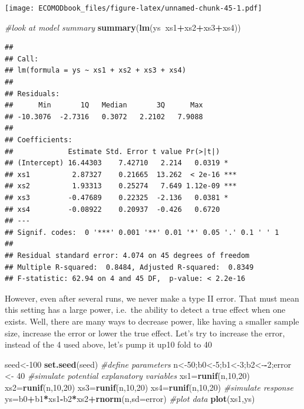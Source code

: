 \documentclass[
]{book}
\newenvironment{Shaded}{\begin{snugshade}}{\end{snugshade}}
\newcommand{\CommentTok}[1]{\textcolor[rgb]{0.56,0.35,0.01}{\textit{#1}}}
\newcommand{\DataTypeTok}[1]{\textcolor[rgb]{0.13,0.29,0.53}{#1}}
\newcommand{\DecValTok}[1]{\textcolor[rgb]{0.00,0.00,0.81}{#1}}
\newcommand{\KeywordTok}[1]{\textcolor[rgb]{0.13,0.29,0.53}{\textbf{#1}}}
\newcommand{\NormalTok}[1]{#1}
\newcommand{\OperatorTok}[1]{\textcolor[rgb]{0.81,0.36,0.00}{\textbf{#1}}}
\newcommand{\StringTok}[1]{\textcolor[rgb]{0.31,0.60,0.02}{#1}}
\begin{document}
\texttt{[image: ECOMODbook\_files/figure-latex/unnamed-chunk-45-1.pdf]}

\begin{Shaded}
\begin{Highlighting}[]
\CommentTok{#look at model summary}
\KeywordTok{summary}\NormalTok{(}\KeywordTok{lm}\NormalTok{(ys}\OperatorTok{~}\NormalTok{xs1}\OperatorTok{+}\NormalTok{xs2}\OperatorTok{+}\NormalTok{xs3}\OperatorTok{+}\NormalTok{xs4))}
\end{Highlighting}
\end{Shaded}

\begin{verbatim}
## 
## Call:
## lm(formula = ys ~ xs1 + xs2 + xs3 + xs4)
## 
## Residuals:
##      Min       1Q   Median       3Q      Max 
## -10.3076  -2.7316   0.3072   2.2102   7.9088 
## 
## Coefficients:
##             Estimate Std. Error t value Pr(>|t|)    
## (Intercept) 16.44303    7.42710   2.214   0.0319 *  
## xs1          2.87327    0.21665  13.262  < 2e-16 ***
## xs2          1.93313    0.25274   7.649 1.12e-09 ***
## xs3         -0.47689    0.22325  -2.136   0.0381 *  
## xs4         -0.08922    0.20937  -0.426   0.6720    
## ---
## Signif. codes:  0 '***' 0.001 '**' 0.01 '*' 0.05 '.' 0.1 ' ' 1
## 
## Residual standard error: 4.074 on 45 degrees of freedom
## Multiple R-squared:  0.8484,	Adjusted R-squared:  0.8349 
## F-statistic: 62.94 on 4 and 45 DF,  p-value: < 2.2e-16
\end{verbatim}

However, even after several runs, we never make a type II error. That must mean this setting has a large power, i.e.~the ability to detect a true effect when one exists. Well, there are many ways to decrease power, like having a smaller sample size, increase the error or lower the true effect. Let's try to increase the error, instead of the 4 used above, let's pump it up10 fold to 40

\begin{Shaded}
\begin{Highlighting}[]
\NormalTok{seed<-}\DecValTok{100}
\KeywordTok{set.seed}\NormalTok{(seed)}
\CommentTok{#define parameters}
\NormalTok{n<-}\DecValTok{50}\NormalTok{;b0<-}\DecValTok{5}\NormalTok{;b1<-}\DecValTok{3}\NormalTok{;b2<-}\OperatorTok{-}\DecValTok{2}\NormalTok{;error <-}\StringTok{ }\DecValTok{40}
\CommentTok{#simulate potential explanatory variables}
\NormalTok{xs1=}\KeywordTok{runif}\NormalTok{(n,}\DecValTok{10}\NormalTok{,}\DecValTok{20}\NormalTok{)}
\NormalTok{xs2=}\KeywordTok{runif}\NormalTok{(n,}\DecValTok{10}\NormalTok{,}\DecValTok{20}\NormalTok{)}
\NormalTok{xs3=}\KeywordTok{runif}\NormalTok{(n,}\DecValTok{10}\NormalTok{,}\DecValTok{20}\NormalTok{)}
\NormalTok{xs4=}\KeywordTok{runif}\NormalTok{(n,}\DecValTok{10}\NormalTok{,}\DecValTok{20}\NormalTok{)}
\CommentTok{#simulate response}
\NormalTok{ys=b0}\OperatorTok{+}\NormalTok{b1}\OperatorTok{*}\NormalTok{xs1}\OperatorTok{-}\NormalTok{b2}\OperatorTok{*}\NormalTok{xs2}\OperatorTok{+}\KeywordTok{rnorm}\NormalTok{(n,}\DataTypeTok{sd=}\NormalTok{error)}
\CommentTok{#plot data}
\KeywordTok{plot}\NormalTok{(xs1,ys)}
\end{Highlighting}
\end{Shaded}
\end{document}
